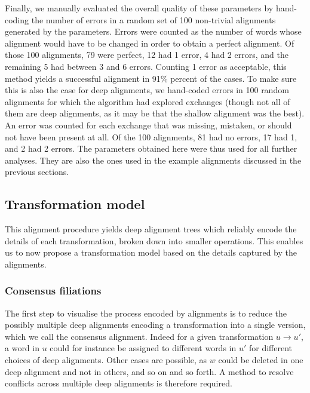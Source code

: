 Finally, we manually evaluated the overall quality of these parameters
by hand-coding the number of errors in a random set of 100 non-trivial
alignments generated by the parameters. Errors were counted as the
number of words whose alignment would have to be changed in order to
obtain a perfect alignment. Of those 100 alignments, 79 were perfect, 12
had 1 error, 4 had 2 errors, and the remaining 5 had between 3 and 6
errors. Counting 1 error as acceptable, this method yields a successful
alignment in 91\% percent of the cases. To make sure this is also the
case for deep alignments, we hand-coded errors in 100 random alignments
for which the algorithm had explored exchanges (though not all of them
are deep alignments, as it may be that the shallow alignment was the
best). An error was counted for each exchange that was missing,
mistaken, or should not have been present at all. Of the 100 alignments,
81 had no errors, 17 had 1, and 2 had 2 errors. The parameters obtained
here were thus used for all further analyses. They are also the ones
used in the example alignments discussed in the previous sections.

\subsection{Transformation model}\label{transformation-model}

This alignment procedure yields deep alignment trees which reliably encode the details of
each transformation, broken down into smaller operations. This enables us to now propose a transformation model based on the details captured by the alignments.

\subsubsection{Consensus filiations}\label{consensus-filiations}

The first step to visualise the process encoded by alignments is to
reduce the possibly multiple deep alignments encoding a transformation
into a single version, which we call the consensus alignment. Indeed for
a given transformation \(u \rightarrow u'\), a word in \(u\) could for
instance be assigned to different words in \(u'\) for different choices
of deep alignments. Other cases are possible, as \(w\) could be deleted
in one deep alignment and not in others, and so on and so forth. A
method to resolve conflicts across multiple deep alignments is therefore
required.


